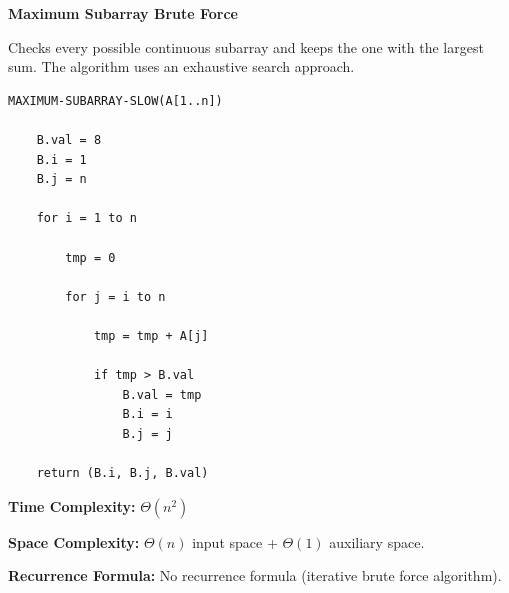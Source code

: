 \documentclass[a4paper,12pt]{article}
\begin{document}
\begin{tcolorbox}[
    colback=gray!30,
    colframe=black,
    boxrule=1pt,
    arc=0mm
]

\begin{tcolorbox}[
    colback=gray!10,
    colframe=black,
    arc=0mm
]
\centering
{\Huge\bfseries Maximum Subarray Brute Force}
\end{tcolorbox}


\begin{tcolorbox}[
    colback=gray!10,
    colframe=black,
    arc=0mm
]
\small
Checks every possible continuous subarray and keeps the one with the largest sum.
The algorithm uses an exhaustive search approach.
\end{tcolorbox}


\begin{tcolorbox}[
    colback=black!5,
    colframe=black,
    arc=0mm,
    title=Pseudo-code
]
\tiny
\begin{lstlisting}
MAXIMUM-SUBARRAY-SLOW(A[1..n])

    B.val = 8
    B.i = 1
    B.j = n

    for i = 1 to n

        tmp = 0

        for j = i to n

            tmp = tmp + A[j]

            if tmp > B.val
                B.val = tmp
                B.i = i
                B.j = j

    return (B.i, B.j, B.val)
\end{lstlisting}
\end{tcolorbox}


\begin{tcolorbox}[
    colback=cyan!20,
    colframe=black,
    arc=0mm
]
\small
\textbf{Time Complexity:}
$\Theta(n^2)$
\end{tcolorbox}


\begin{tcolorbox}[
    colback=violet!20,
    colframe=black,
    arc=0mm
]
\small
\textbf{Space Complexity:}
$\Theta(n)$ input space + $\Theta(1)$ auxiliary space.
\end{tcolorbox}


\begin{tcolorbox}[
    colback=pink!20,
    colframe=black,
    arc=0mm
]
\small
\textbf{Recurrence Formula:}
No recurrence formula (iterative brute force algorithm).
\end{tcolorbox}

\end{tcolorbox}
\end{document}
